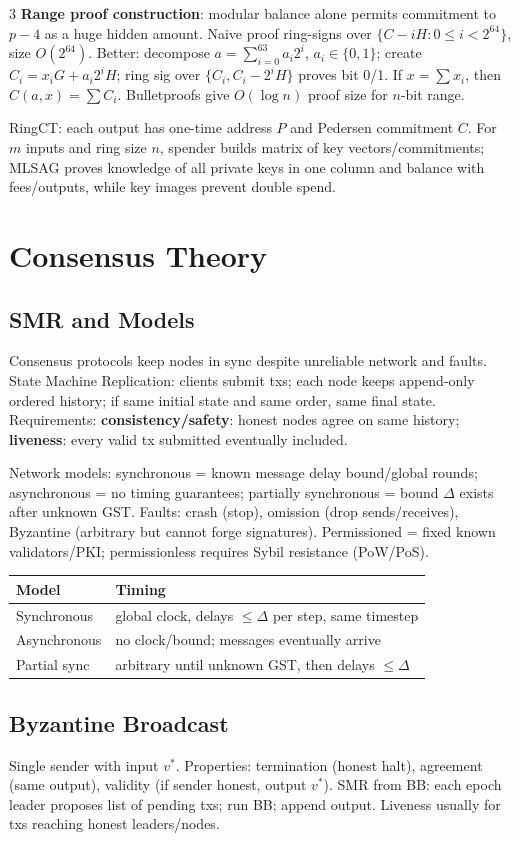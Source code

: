\documentclass[8pt]{extarticle}
\newcommand{\term}[1]{\textbf{#1}}
\begin{document}
\begin{multicols*}{3}
\term{Range proof construction}: modular balance alone permits commitment to $p-4$ as a huge hidden amount. Naive proof ring-signs over $\{C-iH:0\le i<2^{64}\}$, size $O(2^{64})$. Better: decompose $a=\sum_{i=0}^{63}a_i2^i$, $a_i\in\{0,1\}$; create $C_i=x_iG+a_i2^iH$; ring sig over $\{C_i,C_i-2^iH\}$ proves bit 0/1. If $x=\sum x_i$, then $C(a,x)=\sum C_i$. Bulletproofs give $O(\log n)$ proof size for $n$-bit range.

RingCT: each output has one-time address $P$ and Pedersen commitment $C$. For $m$ inputs and ring size $n$, spender builds matrix of key vectors/commitments; MLSAG proves knowledge of all private keys in one column and balance with fees/outputs, while key images prevent double spend.

\section{Consensus Theory}
\subsection{SMR and Models}
Consensus protocols keep nodes in sync despite unreliable network and faults. State Machine Replication: clients submit txs; each node keeps append-only ordered history; if same initial state and same order, same final state. Requirements: \term{consistency/safety}: honest nodes agree on same history; \term{liveness}: every valid tx submitted eventually included.

Network models: synchronous = known message delay bound/global rounds; asynchronous = no timing guarantees; partially synchronous = bound $\Delta$ exists after unknown GST. Faults: crash (stop), omission (drop sends/receives), Byzantine (arbitrary but cannot forge signatures). Permissioned = fixed known validators/PKI; permissionless requires Sybil resistance (PoW/PoS).

\begin{tabularx}{\linewidth}{@{}lX@{}}
\toprule
Model & Timing\\
\midrule
Synchronous & global clock, delays $\le\Delta$ per step, same timestep\\
Asynchronous & no clock/bound; messages eventually arrive\\
Partial sync & arbitrary until unknown GST, then delays $\le\Delta$\\
\bottomrule
\end{tabularx}

\subsection{Byzantine Broadcast}
Single sender with input $v^*$. Properties: termination (honest halt), agreement (same output), validity (if sender honest, output $v^*$). SMR from BB: each epoch leader proposes list of pending txs; run BB; append output. Liveness usually for txs reaching honest leaders/nodes.


\end{multicols*}
\end{document}
